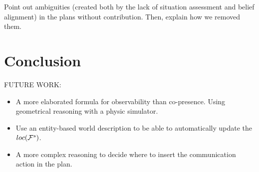 \documentclass[letterpaper]{article} %
\begin{document}
Point out ambiguities (created both by the lack of situation assessment and belief alignment) in the plans without contribution. Then, explain how we removed them. 

\section{Conclusion}

FUTURE WORK:
\begin{itemize}
    \item A more elaborated formula for observability than co-presence. Using geometrical reasoning with a physic simulator.
    \item Use an entity-based world description to be able to automatically update the $loc(\mathcal{F}^{s}_{}{})$.
    \item A more complex reasoning to decide where to insert the communication action in the plan.
\end{itemize}


\end{document}
